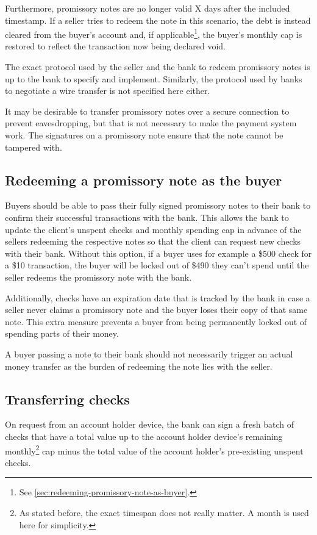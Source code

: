\documentclass[12pt,a4paper]{article}
\begin{document}
\begin{multicols}{2}
	Furthermore, promissory notes are no longer valid X days after the included timestamp. If a seller tries to redeem the note in this scenario, the debt is instead cleared from the buyer's account and, if applicable\footnote{See \autoref{sec:redeeming-promissory-note-as-buyer}.}, the buyer's monthly cap is restored to reflect the transaction now being declared void.

	The exact protocol used by the seller and the bank to redeem promissory notes is up to the bank to specify and implement. Similarly, the protocol used by banks to negotiate a wire transfer is not specified here either.

	It may be desirable to transfer promissory notes over a secure connection to prevent eavesdropping, but that is not necessary to make the payment system work. The signatures on a promissory note ensure that the note cannot be tampered with.
	
	\subsection{Redeeming a promissory note as the buyer}
	\label{sec:redeeming-promissory-note-as-buyer}

	Buyers should be able to pass their fully signed promissory notes to their bank to confirm their successful transactions with the bank. This allows the bank to update the client's unspent checks and monthly spending cap in advance of the sellers redeeming the respective notes so that the client can request new checks with their bank. Without this option, if a buyer uses for example a \$500 check for a \$10 transaction, the buyer will be locked out of \$490 they can't spend until the seller redeems the promissory note with the bank.
	
	Additionally, checks have an expiration date that is tracked by the bank in case a seller never claims a promissory note and the buyer loses their copy of that same note. This extra measure prevents a buyer from being permanently locked out of spending parts of their money.
	
	A buyer passing a note to their bank should not necessarily trigger an actual money transfer as the burden of redeeming the note lies with the seller.

	\subsection{Transferring checks}

	On request from an account holder device, the bank can sign a fresh batch of checks that have a total value up to the account holder device's remaining monthly\footnote{As stated before, the exact timespan does not really matter. A month is used here for simplicity.} cap minus the total value of the account holder's pre-existing unspent checks.


\end{multicols}
\end{document}
